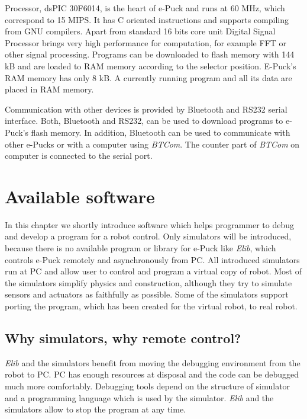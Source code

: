 \documentclass[12pt,notitlepage]{report}
\begin{document}
	Processor, dsPIC 30F6014, is the heart of e-Puck and runs at 60 MHz, which correspond to 15 MIPS.
	It has C oriented instructions and supports compiling from GNU compilers.
	Apart from standard 16 bits core unit Digital Signal Processor brings very high performance for computation,
	for example FFT or other signal processing.
	Programs can be downloaded to flash memory with 144 kB and
	 are loaded to RAM memory according to the selector position.
	E-Puck's RAM memory has only 8 kB. A currently running program and all its data are placed in RAM memory.
	
	Communication with other devices is provided by Bluetooth and RS232 serial interface.
	Both, Bluetooth and RS232, can be used to download programs to e-Puck's flash memory.
	In addition, Bluetooth can be used to communicate with other e-Pucks or with a computer
	using {\it BTCom}. 
	The counter part of {\it BTCom} on computer is connected to the serial port.

\chapter{Available software} \label{chap:software}
	In this chapter we shortly introduce software which helps programmer
	to debug and develop a program for a robot control. Only simulators will be introduced, because 
	there is no available program or library for e-Puck like {\it Elib},
	which controls e-Puck remotely and asynchronously from PC.
	All introduced simulators run at PC and allow user to control and program a virtual copy of robot.
	Most of the simulators simplify physics and construction, although they try to simulate sensors
	and actuators as faithfully as possible. Some of the simulators support porting the program,
	which has been created for the virtual robot, to real robot.
	
\section{Why simulators, why remote control?}
	{\it Elib} and the simulators benefit from moving the debugging environment from the robot to PC.
	PC has enough resources at disposal and the code can be debugged much more comfortably. Debugging
	tools depend on the structure of simulator and a programming language which is used by the simulator.
	{\it Elib} and the simulators allow to stop the program at any time.
	
\end{document}
